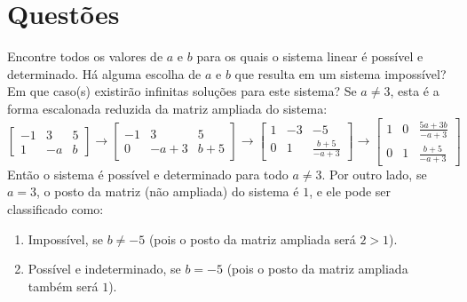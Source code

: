 \documentclass[12pt,a4paper]{article}
\begin{document}
\section*{Questões}
\begin{ExerciseList}
\Exercise[title={2,5}]
Encontre todos os valores de $a$ e $b$ para os quais o sistema linear 
é possível e determinado. Há alguma escolha de $a$ e $b$ que resulta em um sistema impossível? Em que caso(s) existirão infinitas soluções para este sistema?
\Answer Se $a \neq 3$, esta é a forma escalonada reduzida da matriz ampliada do sistema:
\[
\begin{bmatrix}
-1 & 3 & 5 \\
 1 & -a & b
\end{bmatrix}
\rightarrow
\begin{bmatrix}
-1 & 3 & 5 \\
 0 & -a+3 & b+5
\end{bmatrix}
\rightarrow
\begin{bmatrix}
1 & -3 & -5 \\
0 &  1 & \frac{b+5}{-a+3}
\end{bmatrix}
\rightarrow
\begin{bmatrix}
1 & 0 & \frac{5a+3b}{-a+3} \\
0 & 1 & \frac{b+5}{-a+3}
\end{bmatrix}
\]
Então o sistema é possível e determinado para todo $a \neq 3$. Por outro lado, se $a = 3$, o posto da matriz (não ampliada) do sistema é $1$, e ele pode ser classificado como:
\begin{enumerate}
\item Impossível, se $b \neq -5$ (pois o posto da matriz ampliada será $2 > 1$).
\item Possível e indeterminado, se $b = -5$ (pois o posto da matriz ampliada também será $1$).
\end{enumerate}



\end{ExerciseList}
\end{document}
